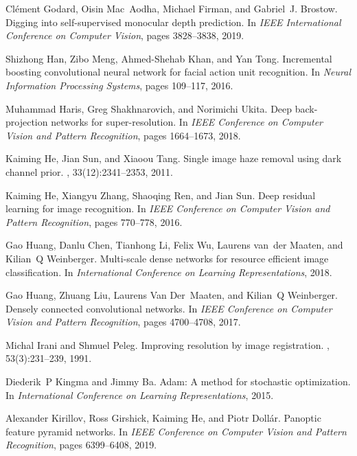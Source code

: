 \documentclass[10pt,twocolumn,letterpaper]{article}
\begin{document}
\begin{thebibliography}{10}
Clément Godard, Oisin Mac~Aodha, Michael Firman, and Gabriel~J. Brostow.
\newblock Digging into self-supervised monocular depth prediction.
\newblock In {\em IEEE International Conference on Computer Vision}, pages
  3828--3838, 2019.

Shizhong Han, Zibo Meng, Ahmed-Shehab Khan, and Yan Tong.
\newblock Incremental boosting convolutional neural network for facial action
  unit recognition.
\newblock In {\em Neural Information Processing Systems}, pages 109--117, 2016.

Muhammad Haris, Greg Shakhnarovich, and Norimichi Ukita.
\newblock Deep back-projection networks for super-resolution.
\newblock In {\em IEEE Conference on Computer Vision and Pattern Recognition},
  pages 1664--1673, 2018.

Kaiming He, Jian Sun, and Xiaoou Tang.
\newblock Single image haze removal using dark channel prior.
,
  33(12):2341--2353, 2011.

Kaiming He, Xiangyu Zhang, Shaoqing Ren, and Jian Sun.
\newblock Deep residual learning for image recognition.
\newblock In {\em IEEE Conference on Computer Vision and Pattern Recognition},
  pages 770--778, 2016.

Gao Huang, Danlu Chen, Tianhong Li, Felix Wu, Laurens van~der Maaten, and
  Kilian~Q Weinberger.
\newblock Multi-scale dense networks for resource efficient image
  classification.
\newblock In {\em International Conference on Learning Representations}, 2018.

Gao Huang, Zhuang Liu, Laurens Van Der~Maaten, and Kilian~Q Weinberger.
\newblock Densely connected convolutional networks.
\newblock In {\em IEEE Conference on Computer Vision and Pattern Recognition},
  pages 4700--4708, 2017.

Michal Irani and Shmuel Peleg.
\newblock Improving resolution by image registration.
, 53(3):231--239,
  1991.

Diederik~P Kingma and Jimmy Ba.
\newblock Adam: A method for stochastic optimization.
\newblock In {\em International Conference on Learning Representations}, 2015.

Alexander Kirillov, Ross Girshick, Kaiming He, and Piotr Doll{\'a}r.
\newblock Panoptic feature pyramid networks.
\newblock In {\em IEEE Conference on Computer Vision and Pattern Recognition},
  pages 6399--6408, 2019.


\end{thebibliography}
\end{document}
